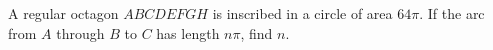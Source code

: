 A regular octagon $ABCDEFGH$ is inscribed in a circle of area $64\pi$. If the arc from $A$ through $B$ to $C$ has length $n\pi$, find $n$.
